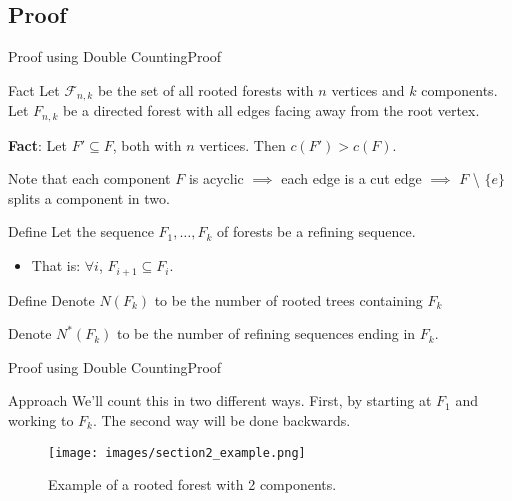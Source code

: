 \documentclass[10pt]{beamer}
\theoremstyle{definition}
\newcommand{\Stwo}{Proof using Double Counting}
\newcommand{\StwoSSproof}{Proof}
\begin{document}
\subsection{\StwoSSproof}
\begin{frame}{\Stwo}{\StwoSSproof}
\begin{block}{Fact}
Let $\mathcal{F}_{n,k}$ be the set of all rooted forests with $n$ vertices and $k$ components. Let $F_{n,k}$ be a directed forest with all edges facing away from the root vertex.

\textbf{Fact}: Let $F'\subseteq F$, both with $n$ vertices. Then $c(F')>c(F)$. 

Note that each component $F$ is acyclic $\implies$ each edge is a cut edge $\implies$ $F$
\textbackslash{} $\{e\}$ splits a component in two.
\end{block}

\pause{}

\begin{block}{Define}
Let the sequence $F_{1},\ldots, F_{k}$ of forests be a refining sequence. 
\begin{itemize}
  \item That is: $\forall i$, $F_{i+1}\subseteq F_{i}$.
\end{itemize}
\end{block}

\pause{}

\begin{block}{Define}
Denote $N(F_{k})$ to be the number of rooted trees containing $F_{k}$

Denote $N^{*}(F_{k})$ to be the number of refining sequences ending in $F_{k}$.
\end{block}

\end{frame}

\begin{frame}{\Stwo}{\StwoSSproof}

\begin{block}{Approach}
We'll count this in two different ways. First, by starting at $F_{1}$ and working to $F_{k}$. The second way will be done backwards.
\end{block}

\pause{}

\begin{figure}
  \texttt{[image: images/section2\_example.png]}
  \caption{Example of a rooted forest with 2 components.}
  \label{fig:section2_example2}
\end{figure}

\end{frame}
\end{document}
